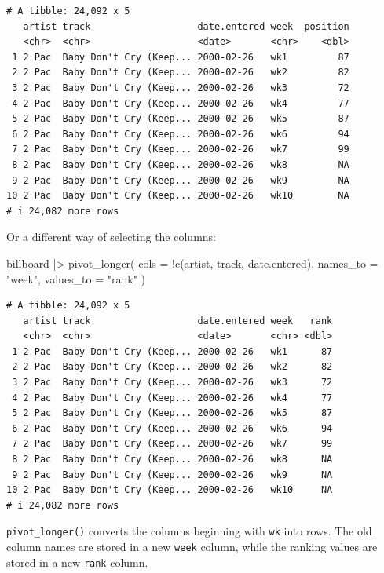 \documentclass[
  letterpaper,
  DIV=11,
  numbers=noendperiod]{scrreprt}
\newenvironment{Shaded}{\begin{snugshade}}{\end{snugshade}}
\newcommand{\AttributeTok}[1]{\textcolor[rgb]{0.40,0.45,0.13}{#1}}
\newcommand{\FunctionTok}[1]{\textcolor[rgb]{0.28,0.35,0.67}{#1}}
\newcommand{\NormalTok}[1]{\textcolor[rgb]{0.00,0.23,0.31}{#1}}
\newcommand{\SpecialCharTok}[1]{\textcolor[rgb]{0.37,0.37,0.37}{#1}}
\newcommand{\StringTok}[1]{\textcolor[rgb]{0.13,0.47,0.30}{#1}}
\begin{document}
\begin{verbatim}
# A tibble: 24,092 x 5
   artist track                   date.entered week  position
   <chr>  <chr>                   <date>       <chr>    <dbl>
 1 2 Pac  Baby Don't Cry (Keep... 2000-02-26   wk1         87
 2 2 Pac  Baby Don't Cry (Keep... 2000-02-26   wk2         82
 3 2 Pac  Baby Don't Cry (Keep... 2000-02-26   wk3         72
 4 2 Pac  Baby Don't Cry (Keep... 2000-02-26   wk4         77
 5 2 Pac  Baby Don't Cry (Keep... 2000-02-26   wk5         87
 6 2 Pac  Baby Don't Cry (Keep... 2000-02-26   wk6         94
 7 2 Pac  Baby Don't Cry (Keep... 2000-02-26   wk7         99
 8 2 Pac  Baby Don't Cry (Keep... 2000-02-26   wk8         NA
 9 2 Pac  Baby Don't Cry (Keep... 2000-02-26   wk9         NA
10 2 Pac  Baby Don't Cry (Keep... 2000-02-26   wk10        NA
# i 24,082 more rows
\end{verbatim}

Or a different way of selecting the columns:

\begin{Shaded}
\begin{Highlighting}[]
\NormalTok{billboard }\SpecialCharTok{|\textgreater{}}
  \FunctionTok{pivot\_longer}\NormalTok{(}
    \AttributeTok{cols =} \SpecialCharTok{!}\FunctionTok{c}\NormalTok{(artist, track, date.entered),}
    \AttributeTok{names\_to =} \StringTok{"week"}\NormalTok{,}
    \AttributeTok{values\_to =} \StringTok{"rank"}
\NormalTok{  )}
\end{Highlighting}
\end{Shaded}

\begin{verbatim}
# A tibble: 24,092 x 5
   artist track                   date.entered week   rank
   <chr>  <chr>                   <date>       <chr> <dbl>
 1 2 Pac  Baby Don't Cry (Keep... 2000-02-26   wk1      87
 2 2 Pac  Baby Don't Cry (Keep... 2000-02-26   wk2      82
 3 2 Pac  Baby Don't Cry (Keep... 2000-02-26   wk3      72
 4 2 Pac  Baby Don't Cry (Keep... 2000-02-26   wk4      77
 5 2 Pac  Baby Don't Cry (Keep... 2000-02-26   wk5      87
 6 2 Pac  Baby Don't Cry (Keep... 2000-02-26   wk6      94
 7 2 Pac  Baby Don't Cry (Keep... 2000-02-26   wk7      99
 8 2 Pac  Baby Don't Cry (Keep... 2000-02-26   wk8      NA
 9 2 Pac  Baby Don't Cry (Keep... 2000-02-26   wk9      NA
10 2 Pac  Baby Don't Cry (Keep... 2000-02-26   wk10     NA
# i 24,082 more rows
\end{verbatim}

\texttt{pivot\_longer()} converts the columns beginning with \texttt{wk}
into rows. The old column names are stored in a new \texttt{week}
column, while the ranking values are stored in a new \texttt{rank}
column.
\end{document}
